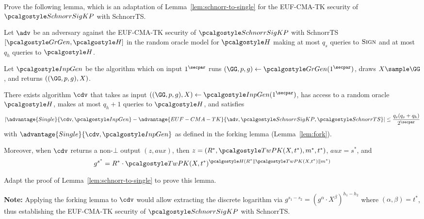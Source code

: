 \begin{exercise}\label{ex:schnorrkp-to-single}
  Prove the following lemma, which is an adaptation of Lemma~\ref{lem:schnorr-to-single} for the EUF-CMA-TK security of $\algo{SchnorrSigKP}$ with SchnorrTS.
  
  \begin{lemma}\label{lem:schnorrkp-to-single}
    Let $\adv$ be an adversary against the EUF-CMA-TK security of $\algo{SchnorrSigKP}$ with SchnorrTS$[\grgen, \algo{H}]$ in the random oracle model for $\algo{H}$ making at most $q_s$ queries to ${\normalfont\textsc{Sign}}$ and at most $q_h$ queries to $\algo{H}$.
    
    Let $\algo{InpGen}$ be the algorithm which on input $1^\secpar$ runs $(\GG, p, g) \gets \grgen(1^\secpar)$, draws $X \sample \GG$, and returns $((\GG, p, g), X)$.
    
    There exists algorithm $\cdv$ that takes as input $(\gparam, X) \gets \algo{InpGen}(1^\secpar)$, has access to a random oracle $\algo{H}$, makes at most $q_h + 1$ queries to $\algo{H}$, and satisfies
    \[
      \left|\advantage{Single}{\cdv, \algo{InpGen}} - \advantage{EUF-CMA-TK}{\adv, \algo{SchnorrSigKP}, \algo{SchnorrTS}}\right| \leq \frac{q_s(q_s + q_h)}{2^\secpar}
    \]
    with $\advantage{Single}{\cdv, \algo{InpGen}}$ as defined in the forking lemma (Lemma~\ref{lem:fork}).
    
    Moreover, when $\cdv$ returns a non-$\bot$ output $(z, \mathit{aux})$, then $z = (R^*, \algo{TwPK}(X, t^*), m^*, t^*)$, $\mathit{aux} = s^*$, and
    \[
      g^{s^*} = R^* \cdot \algo{TwPK}(X, t^*)^{\algo{H}(R^* \| \algo{TwPK}(X, t^*) \| m^*)}
    \]
  \end{lemma}
  
  Adapt the proof of Lemma~\ref{lem:schnorr-to-single} to prove this lemma.
  
  \textbf{Note:} Applying the forking lemma to $\cdv$ would allow extracting the discrete logarithm via $g^{s_1 - s_2} = (g^\alpha \cdot X^\beta)^{h_1 - h_2}$ where $(\alpha, \beta) = t^*$, thus establishing the EUF-CMA-TK security of $\algo{SchnorrSigKP}$ with SchnorrTS.
\end{exercise}

